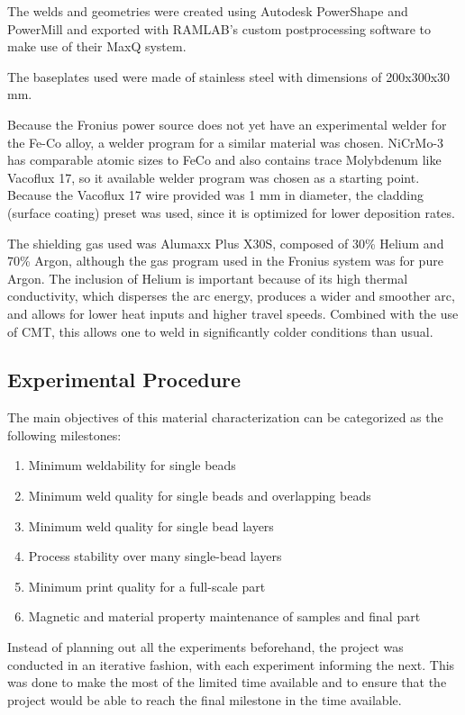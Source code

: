 The welds and geometries were created using Autodesk PowerShape and PowerMill and exported with RAMLAB's custom postprocessing software to make use of their MaxQ system.

The baseplates used were made of stainless steel with dimensions of 200x300x30 mm.

Because the Fronius power source does not yet have an experimental welder for the Fe-Co alloy, a welder program for a similar material was chosen. NiCrMo-3 has comparable atomic sizes to FeCo and also contains trace Molybdenum like Vacoflux 17, so it available welder program was chosen as a starting point. Because the Vacoflux 17 wire provided was 1 mm in diameter, the cladding (surface coating) preset was used, since it is optimized for lower deposition rates.

The shielding gas used was Alumaxx Plus X30S, composed of 30\% Helium and 70\% Argon, although the gas program used in the Fronius system was for pure Argon. The inclusion of Helium is important because of its high thermal conductivity, which disperses the arc energy, produces a wider and smoother arc, and allows for lower heat inputs and higher travel speeds. Combined with the use of CMT, this allows one to weld in significantly colder conditions than usual.

\subsection{Experimental Procedure}

The main objectives of this material characterization can be categorized as the following milestones:

\begin{enumerate}
    \item Minimum weldability for single beads
    \item Minimum weld quality for single beads and overlapping beads
    \item Minimum weld quality for single bead layers
    \item Process stability over many single-bead layers
    \item Minimum print quality for a full-scale part
    \item Magnetic and material property maintenance of samples and final part
\end{enumerate}

Instead of planning out all the experiments beforehand, the project was conducted in an iterative fashion, with each experiment informing the next. This was done to make the most of the limited time available and to ensure that the project would be able to reach the final milestone in the time available.

